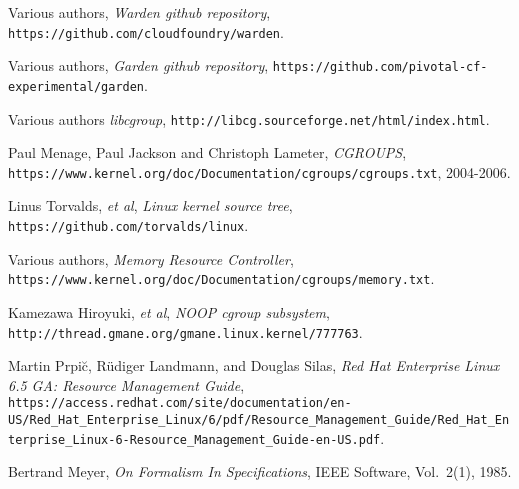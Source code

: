 \documentclass[a4paper,twoside,12pt]{article}
\begin{document}
\newpage
\begin{flushleft}
\begin{thebibliography}{99}
\label{sec:references}


  Various authors,
  \emph{Warden github repository},
  \texttt{https://github.com/cloudfoundry/warden}.

  Various authors,
  \emph{Garden github repository},
  \texttt{https://github.com/pivotal-cf-experimental/garden}.

  Various authors
  \emph{libcgroup},
  {\small \texttt{http://libcg.sourceforge.net/html/index.html}}.

  Paul Menage, Paul Jackson and Christoph Lameter,
  \emph{CGROUPS},
  {\small \texttt{https://www.kernel.org/doc/Documentation/cgroups/cgroups.txt}}, 2004-2006.

  Linus Torvalds, \emph{et al},
  \emph{Linux kernel source tree},
  {\small \texttt{https://github.com/torvalds/linux}}.

  Various authors,
  \emph{Memory Resource Controller},
  {\small \texttt{https://www.kernel.org/doc/Documentation/cgroups/memory.txt}}.

  Kamezawa Hiroyuki, \emph{et al},
  \emph{NOOP cgroup subsystem},
  {\small \texttt{http://thread.gmane.org/gmane.linux.kernel/777763}}.

  Martin Prpi\u{c}, R\"udiger Landmann, and Douglas Silas,
  \emph{Red Hat Enterprise Linux 6.5 GA: Resource Management Guide},
  {\small \texttt{https://access.redhat.com/site/documentation/en-US\slash{}Red\_Hat\_Enterprise\_Linux/6/pdf/Resource\_Management\_Guide\slash{}Red\_Hat\_Enterprise\_Linux-6-Resource\_Management\_Guide-en-US.pdf}}.

  Bertrand Meyer,
  \emph{On Formalism In Specifications},
  IEEE Software, Vol.~2(1), 1985.
\end{thebibliography}
\end{flushleft}
\end{document}
